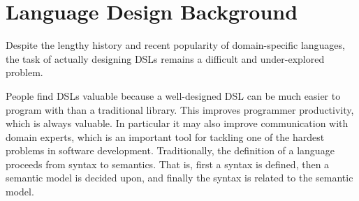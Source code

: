 \section{Language Design Background}
Despite the lengthy history and recent popularity of domain-specific languages, the task of actually
designing DSLs remains a difficult and under-explored problem.

People find DSLs valuable because a well-designed DSL can be much easier to program with than a traditional library. This improves programmer productivity, which is always valuable. In particular it may also improve communication with domain experts, which is an important tool for tackling one of the hardest problems in software development.
Traditionally, the definition of a language proceeds from syntax to semantics. That is, first a syntax is
defined, then a semantic model is decided upon, and finally the syntax is related to the semantic model. 
